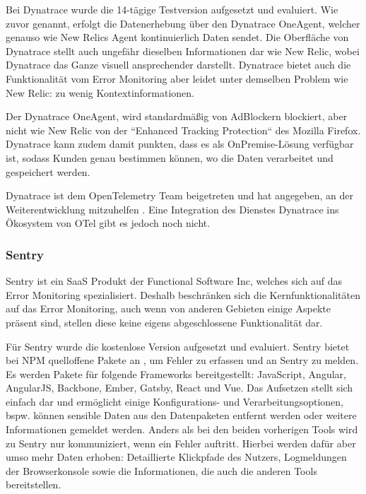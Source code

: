 Bei Dynatrace wurde die 14-tägige Testversion aufgesetzt und evaluiert. Wie zuvor genannt, erfolgt die Datenerhebung über den Dynatrace OneAgent, welcher genauso wie New Relics Agent kontinuierlich Daten sendet. Die Oberfläche von Dynatrace stellt auch ungefähr dieselben Informationen dar wie New Relic, wobei Dynatrace das Ganze visuell ansprechender darstellt. Dynatrace bietet auch die Funktionalität vom Error Monitoring aber leidet unter demselben Problem wie New Relic: zu wenig Kontextinformationen.

Der Dynatrace OneAgent, wird standardmäßig von AdBlockern blockiert, aber nicht wie New Relic von der ``Enhanced Tracking Protection`` des Mozilla Firefox. Dynatrace kann zudem damit punkten, dass es als OnPremise-Lösung verfügbar ist, sodass Kunden genau bestimmen können, wo die Daten verarbeitet und gespeichert werden.

Dynatrace ist dem OpenTelemetry Team beigetreten und hat angegeben, an der Weiterentwicklung mitzuhelfen \cite{DynatraceJoinOTelProject}. Eine Integration des Dienstes Dynatrace ins Ökosystem von OTel gibt es jedoch noch nicht.

\subsubsection{Sentry}

Sentry \cite{Sentry} ist ein SaaS Produkt der Functional Software Inc, welches sich auf das Error Monitoring spezialisiert. Deshalb beschränken sich die Kernfunktionalitäten auf das Error Monitoring, auch wenn von anderen Gebieten einige Aspekte präsent sind, stellen diese keine eigens abgeschlossene Funktionalität dar.

Für Sentry wurde die kostenlose Version aufgesetzt und evaluiert. Sentry bietet bei NPM quelloffene Pakete an \cite{SentryJSGithub}, um Fehler zu erfassen und an Sentry zu melden. Es werden Pakete für folgende Frameworks bereitgestellt: JavaScript, Angular, AngularJS, Backbone, Ember, Gatsby, React und Vue. Das Aufsetzen stellt sich einfach dar und ermöglicht einige Konfigurations- und Verarbeitungsoptionen, bspw. können sensible Daten aus den Datenpaketen entfernt werden oder weitere Informationen gemeldet werden. Anders als bei den beiden vorherigen Tools wird zu Sentry nur kommuniziert, wenn ein Fehler auftritt. Hierbei werden dafür aber umso mehr Daten erhoben: Detaillierte Klickpfade des Nutzers, Logmeldungen der Browserkonsole sowie die Informationen, die auch die anderen Tools bereitstellen.

